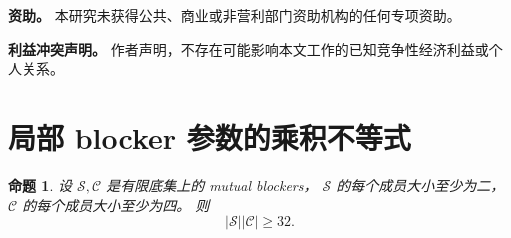 \documentclass[UTF8,11pt,a4paper,fontset=fandol]{ctexart}
\newtheorem{proposition}[theorem]{命题}
\theoremstyle{definition}
\theoremstyle{remark}
\begin{document}
\par\medskip\noindent\textbf{资助。}\quad
本研究未获得公共、商业或非营利部门资助机构的任何专项资助。

\par\medskip\noindent\textbf{利益冲突声明。}\quad
作者声明，不存在可能影响本文工作的已知竞争性经济利益或个人关系。

\appendix

\section{局部 blocker 参数的乘积不等式}
\label{app:m24}

\begin{proposition}
\label{prop:m24-product}
设 $\mathcal S,\mathcal C$ 是有限底集上的 mutual blockers，
$\mathcal S$ 的每个成员大小至少为二，$\mathcal C$ 的每个成员大小至少为四。
则
\[
  |\mathcal S||\mathcal C|\geq32.
\]
\end{proposition}
\end{document}
